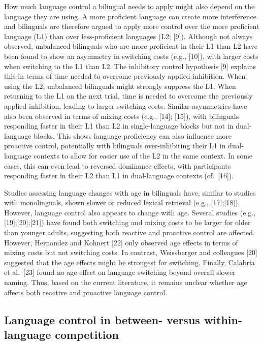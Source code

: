 \documentclass[
]{article}
\begin{document}
How much language control a bilingual needs to apply might also depend on the language they are using. A more proficient language can create more interference and bilinguals are therefore argued to apply more control over the more proficient language (L1) than over less-proficient languages (L2; {[}9{]}). Although not always observed, unbalanced bilinguals who are more proficient in their L1 than L2 have been found to show an asymmetry in switching costs (e.g., {[}10{]}), with larger costs when switching to the L1 than L2. The inhibitory control hypothesis {[}9{]} explains this in terms of time needed to overcome previously applied inhibition. When using the L2, unbalanced bilinguals might strongly suppress the L1. When returning to the L1 on the next trial, time is needed to overcome the previously applied inhibition, leading to larger switching costs. Similar asymmetries have also been observed in terms of mixing costs (e.g., {[}14{]}; {[}15{]}), with bilinguals responding faster in their L1 than L2 in single-language blocks but not in dual-language blocks. This shows language proficiency can also influence more proactive control, potentially with bilinguals over-inhibiting their L1 in dual-language contexts to allow for easier use of the L2 in the same context. In some cases, this can even lead to reversed dominance effects, with participants responding faster in their L2 than L1 in dual-language contexts (cf.~{[}16{]}).

Studies assessing language changes with age in bilinguals have, similar to studies with monolinguals, shown slower or reduced lexical retrieval (e.g., {[}17{]};{[}18{]}). However, language control also appears to change with age. Several studies (e.g., {[}19{]};{[}20{]};{[}21{]}) have found both switching and mixing costs to be larger for older than younger adults, suggesting both reactive and proactive control are affected. However, Hernandez and Kohnert {[}22{]} only observed age effects in terms of mixing costs but not switching costs. In contrast, Weissberger and colleagues {[}20{]} suggested that the age effects might be strongest for switching. Finally, Calabria et al.~{[}23{]} found no age effect on language switching beyond overall slower naming. Thus, based on the current literature, it remains unclear whether age affects both reactive and proactive language control.

\hypertarget{language-control-in-between--versus-within-language-competition}{%
\subsection{Language control in between- versus within-language competition}\label{language-control-in-between--versus-within-language-competition}}
\end{document}
